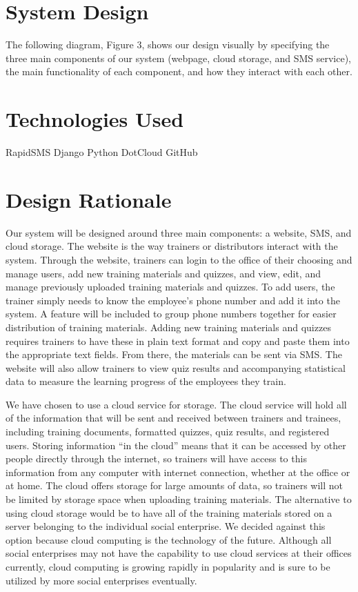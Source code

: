 \section{System Design}
The following diagram, Figure 3, shows our design visually by specifying the three main components of our system (webpage, cloud storage, and SMS service), the main functionality of each component, and how they interact with each other.

\section{Technologies Used}
RapidSMS
Django
Python
DotCloud
GitHub

\section{Design Rationale}
Our system will be designed around three main components: a website, SMS, and cloud storage. The website is the way trainers or distributors interact with the system. Through the website, trainers can login to the office of their choosing and manage users, add new training materials and quizzes, and view, edit, and manage previously uploaded training materials and quizzes. To add users, the trainer simply needs to know the employee’s phone number and add it into the system. A feature will be included to group phone numbers together for easier distribution of training materials. Adding new training materials and quizzes requires trainers to have these in plain text format and copy and paste them into the appropriate text fields. From there, the materials can be sent via SMS. The website will also allow trainers to view quiz results and accompanying statistical data to measure the learning progress of the employees they train. 

We have chosen to use a cloud service for storage. The cloud service will hold all of the information that will be sent and received between trainers and trainees, including training documents, formatted quizzes, quiz results, and registered users. Storing information “in the cloud” means that it can be accessed by other people directly through the internet, so trainers will have access to this information from any computer with internet connection, whether at the office or at home. The cloud offers storage for large amounts of data, so trainers will not be limited by storage space when uploading training materials. The alternative to using cloud storage would be to have all of the training materials stored on a server belonging to the individual social enterprise. We decided against this option because cloud computing is the technology of the future. Although all social enterprises may not have the capability to use cloud services at their offices currently, cloud computing is growing rapidly in popularity and is sure to be utilized by more social enterprises eventually.

